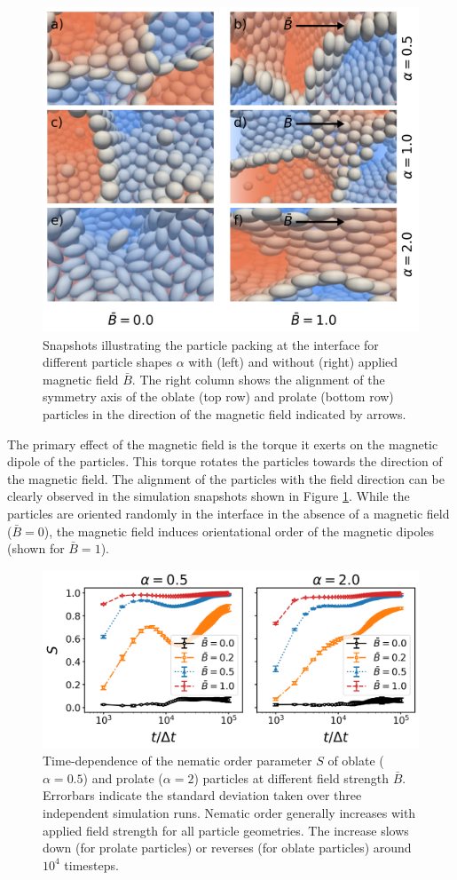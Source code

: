 \begin{figure}
\centering
\includegraphics[width=0.5\columnwidth]{figures/results/paper1/particle_packing_viz.png}
\caption{Snapshots illustrating the particle packing at the interface for different particle shapes $\alpha$ with (left) 
        and without (right) applied magnetic field $\bar{B}$. The right column shows the alignment of the symmetry axis of 
        the oblate (top row) and prolate (bottom row) particles in the direction of the magnetic field indicated by arrows.}
\label{fig:packing_viz}
\end{figure}

The primary effect of the magnetic field is the torque it exerts on the
magnetic dipole of the particles. This torque rotates the particles
towards the direction of the magnetic field. The alignment of the
particles with the field direction can be clearly observed in the
simulation snapshots shown in Figure \ref{fig:packing_viz}. While the
particles are oriented randomly in the interface in the absence of a
magnetic field (\(\bar{B}=0\)), the magnetic field induces orientational
order of the magnetic dipoles (shown for \(\bar{B}=1\)).

\begin{figure}
\centering
\includegraphics[scale = 0.4]{figures/results/paper1/S-vs-t.png}
\caption{Time-dependence of the nematic order parameter $S$ of oblate ($\alpha=0.5$) and prolate ($\alpha=2$) 
        particles at different field strength $\bar{B}$. Errorbars indicate the standard deviation taken over 
        three independent simulation runs. Nematic order generally increases with applied field strength for all particle geometries. 
        The increase slows down (for prolate particles) or reverses (for oblate particles) around $10^4$ timesteps.}
\label{fig:nematic_time}
\end{figure}

